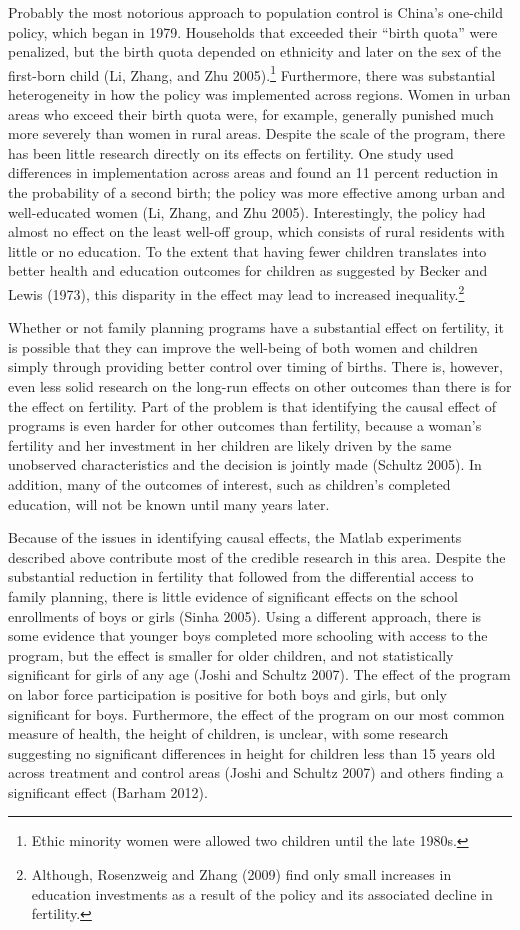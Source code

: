 \documentclass[]{article}
\begin{document}
Probably the most notorious approach to population control is China's one-child policy, which began in 1979. Households that exceeded their ``birth quota'' were penalized, but the birth quota depended on ethnicity and later on the sex of the first-born child (Li, Zhang, and Zhu 2005).\footnote{Ethic minority women were allowed two children until the late 1980s.} Furthermore, there was substantial heterogeneity in how the policy was implemented across regions. Women in urban areas who exceed their birth quota were, for example, generally punished much more severely than women in rural areas. Despite the scale of the program, there has been little research directly on its effects on fertility. One study used differences in implementation across areas and found an 11 percent reduction in the probability of a second birth; the policy was more effective among urban and well-educated women (Li, Zhang, and Zhu 2005). Interestingly, the policy had almost no eﬀect on the least well-oﬀ group, which consists of rural residents with little or no education. To the extent that having fewer children translates into better health and education outcomes for children as suggested by Becker and Lewis (1973), this disparity in the effect may lead to increased inequality.\footnote{Although, Rosenzweig and Zhang (2009) find only small increases in education investments as a result of the policy and its associated decline in fertility.}

Whether or not family planning programs have a substantial effect on fertility, it is possible that they can improve the well-being of both women and children simply through providing better control over timing of births. There is, however, even less solid research on the long-run effects on other outcomes than there is for the effect on fertility. Part of the problem is that identifying the causal effect of programs is even harder for other outcomes than fertility, because a woman's fertility and her investment in her children are likely driven by the same unobserved characteristics and the decision is jointly made (Schultz 2005). In addition, many of the outcomes of interest, such as children's completed education, will not be known until many years later.

Because of the issues in identifying causal effects, the Matlab experiments described above contribute most of the credible research in this area. Despite the substantial reduction in fertility that followed from the differential access to family planning, there is little evidence of significant effects on the school enrollments of boys or girls (Sinha 2005). Using a different approach, there is some evidence that younger boys completed more schooling with access to the program, but the effect is smaller for older children, and not statistically significant for girls of any age (Joshi and Schultz 2007). The effect of the program on labor force participation is positive for both boys and girls, but only signiﬁcant for boys. Furthermore, the effect of the program on our most common measure of health, the height of children, is unclear, with some research suggesting no significant differences in height for children less than 15 years old across treatment and control areas (Joshi and Schultz 2007) and others finding a significant effect (Barham 2012).
\end{document}
